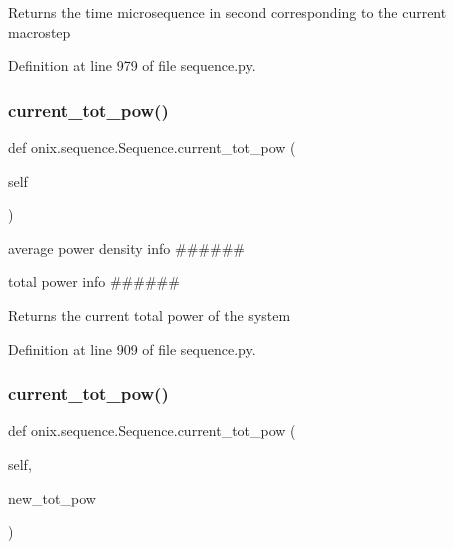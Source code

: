 \begin{DoxyVerb}Returns the time microsequence in second corresponding to the current macrostep
\end{DoxyVerb}
 

Definition at line 979 of file sequence.\+py.

\mbox{\label{classonix_1_1sequence_1_1Sequence_a8ad2f8fc75d5951798c64bfd8924b7c0}} 
\subsubsection{\texorpdfstring{current\+\_\+tot\+\_\+pow()}{current\_tot\_pow()}\hspace{0.1cm}{\footnotesize\ttfamily [1/2]}}
{\footnotesize\ttfamily def onix.\+sequence.\+Sequence.\+current\+\_\+tot\+\_\+pow (\begin{DoxyParamCaption}\item[{}]{self }\end{DoxyParamCaption})}



average power density info \#\#\#\#\#\# 

total power info \#\#\#\#\#\# \begin{DoxyVerb}Returns the current total power of the system
\end{DoxyVerb}
 

Definition at line 909 of file sequence.\+py.

\mbox{\label{classonix_1_1sequence_1_1Sequence_a1a280133e5dae74875a5d1e80f923c10}} 
\subsubsection{\texorpdfstring{current\+\_\+tot\+\_\+pow()}{current\_tot\_pow()}\hspace{0.1cm}{\footnotesize\ttfamily [2/2]}}
{\footnotesize\ttfamily def onix.\+sequence.\+Sequence.\+current\+\_\+tot\+\_\+pow (\begin{DoxyParamCaption}\item[{}]{self,  }\item[{}]{new\+\_\+tot\+\_\+pow }\end{DoxyParamCaption})}


